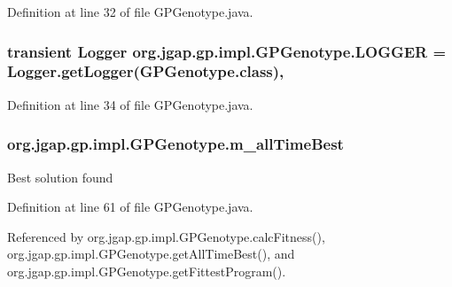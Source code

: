 Definition at line 32 of file G\-P\-Genotype.\-java.

\hypertarget{classorg_1_1jgap_1_1gp_1_1impl_1_1_g_p_genotype_ada30eb741391730f266047d15cd40338}{
\subsubsection[{L\-O\-G\-G\-E\-R}]{\setlength{\rightskip}{0pt plus 5cm}transient Logger org.\-jgap.\-gp.\-impl.\-G\-P\-Genotype.\-L\-O\-G\-G\-E\-R = Logger.\-get\-Logger(G\-P\-Genotype.\-class)\hspace{0.3cm}{\ttfamily [static]}, {\ttfamily [private]}}}\label{classorg_1_1jgap_1_1gp_1_1impl_1_1_g_p_genotype_ada30eb741391730f266047d15cd40338}


Definition at line 34 of file G\-P\-Genotype.\-java.

\hypertarget{classorg_1_1jgap_1_1gp_1_1impl_1_1_g_p_genotype_a6bd9f97a0bb39ec138f6d8ca8ebd25e5}{
\subsubsection[{m\-\_\-all\-Time\-Best}]{ org.\-jgap.\-gp.\-impl.\-G\-P\-Genotype.\-m\-\_\-all\-Time\-Best\hspace{0.3cm}{\ttfamily [private]}}}\label{classorg_1_1jgap_1_1gp_1_1impl_1_1_g_p_genotype_a6bd9f97a0bb39ec138f6d8ca8ebd25e5}
Best solution found 

Definition at line 61 of file G\-P\-Genotype.\-java.



Referenced by org.\-jgap.\-gp.\-impl.\-G\-P\-Genotype.\-calc\-Fitness(), org.\-jgap.\-gp.\-impl.\-G\-P\-Genotype.\-get\-All\-Time\-Best(), and org.\-jgap.\-gp.\-impl.\-G\-P\-Genotype.\-get\-Fittest\-Program().


